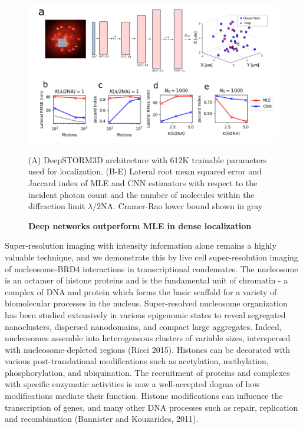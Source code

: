 \documentclass{ucetd}
\begin{document}
\begin{figure}
\includegraphics[width=15cm]{PSF2D.png}
\caption{\textbf{Deep networks outperform MLE in dense localization}} (A) DeepSTORM3D architecture with 612K trainable parameters used for localization. (B-E) Lateral root mean squared error and Jaccard index of MLE and CNN estimators with respect to the incident photon count and the number of molecules within the diffraction limit $\lambda/2\mathrm{NA}$. Cramer-Rao lower bound shown in gray\end{figure}


Super-resolution imaging with intensity information alone remains a highly valuable technique, and we demonstrate this by live cell super-resolution imaging of nucleosome-BRD4 interactions in transcriptional condensates. The nucleosome is an octamer of histone proteins and is the fundamental unit of chromatin - a complex of DNA and protein which forms the basic scaffold for a variety of biomolecular processes in the nucleus. Super-resolved nucleosome organization has been studied extensively in various epigenomic states to reveal segregated nanoclusters, dispersed nanodomains, and compact large aggregates. Indeed, nucleosomes assemble into heterogeneous clusters of variable sizes, interspersed with nucleosome-depleted regions (Ricci 2015). Histones can be decorated with various post-translational modifications such as acetylation, methylation, phosphorylation, and ubiquination. The recruitment of proteins and complexes with specific enzymatic activities is now a well-accepted dogma of how modifications mediate their function. Histone modifications can influence the transcription of genes, and many other DNA processes such as repair, replication and recombination (Bannister and Kouzarides, 2011). 
\end{document}
